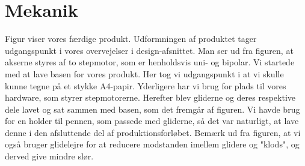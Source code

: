 \chapter[Implementering af mekanik]{Mekanik}


Figur  viser vores færdige produkt.
Udformningen af produktet tager udgangspunkt i vores overvejelser i design-afsnittet.
Man ser ud fra figuren, at akserne styres af to stepmotor, som er henholdsvis uni- og bipolar.
Vi startede med at lave basen for vores produkt. Her tog vi udgangspunkt i at vi skulle kunne
tegne på et stykke A4-papir. Yderligere har vi brug for plads til vores hardware, som styrer
stepmotorerne. Herefter blev gliderne og deres respektive dele lavet og sat sammen med basen,
som det fremgår af figuren. Vi havde brug for en holder til pennen, som passede med gliderne,
så det var naturligt, at lave denne i den afsluttende del af produktionsforløbet. Bemærk ud
fra figuren, at vi også bruger glidelejre for at reducere modstanden imellem glidere og "klods",
og derved give mindre slør.



